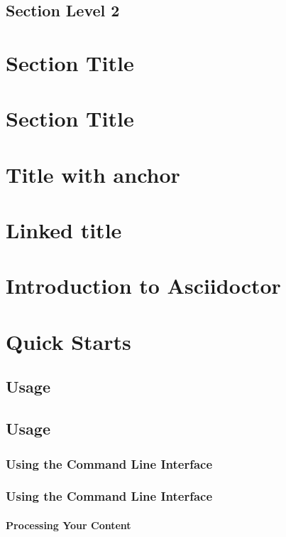 \subsection*{Section Level 2}
\hypertarget{_section_level_2}{}

\section*{Section Title}
\hypertarget{_section_title}{}

\section*{Section Title}
\hypertarget{_section_title}{}

\section*{Title with anchor}
\hypertarget{_title_with_anchor}{}

\section*{Linked title}
\hypertarget{_linked_title}{}

\section{Introduction to Asciidoctor}
\hypertarget{_introduction_to_asciidoctor}{}
\section{Quick Starts}
\hypertarget{_quick_starts}{\subsection{Usage}}
\subsection{Usage}
\hypertarget{_usage}{\subsubsection{Using the Command Line Interface}}
\subsubsection{Using the Command Line Interface}
\hypertarget{_using_the_command_line_interface}{\paragraph{Processing Your Content}}

